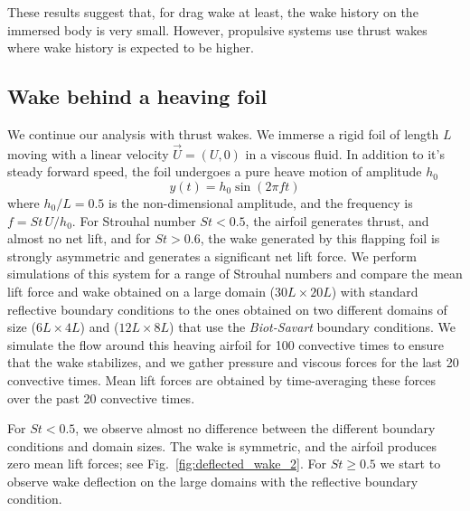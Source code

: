 \documentclass{article}
\begin{document}
These results suggest that, for drag wake at least, the wake history on the immersed body is very small. However, propulsive systems use thrust wakes where wake history is expected to be higher.

\subsection{Wake behind a heaving foil}

We continue our analysis with thrust wakes. We immerse a rigid foil of length $L$ moving with a linear velocity $\vec{U}=(U,0)$ in a viscous fluid. In addition to it's steady forward speed, the foil undergoes a pure heave motion of amplitude $h_0$
\begin{equation}
    y(t) = h_0 \sin(2\pi f t)
\end{equation}
where $h_0/L=0.5$ is the non-dimensional amplitude, and the frequency is $f = St\,U/h_0$. For Strouhal number $St<0.5$, the airfoil generates thrust, and almost no net lift, and for $St>0.6$, the wake generated by this flapping foil is strongly asymmetric and generates a significant net lift force. We perform simulations of this system for a range of Strouhal numbers and compare the mean lift force and wake obtained on a large domain ($30L\times20L$) with standard reflective boundary conditions to the ones obtained on two different domains of size ($6L\times4L$) and ($12L\times8L$) that use the \emph{Biot-Savart} boundary conditions. We simulate the flow around this heaving airfoil for 100 convective times to ensure that the wake stabilizes, and we gather pressure and viscous forces for the last 20 convective times. Mean lift forces are obtained by time-averaging these forces over the past 20 convective times.

For $St<0.5$, we observe almost no difference between the different boundary conditions and domain sizes. The wake is symmetric, and the airfoil produces zero mean lift forces; see Fig.~\ref{fig:deflected_wake_2}. For $St\ge 0.5$ we start to observe wake deflection on the large domains with the reflective boundary condition.
\end{document}
